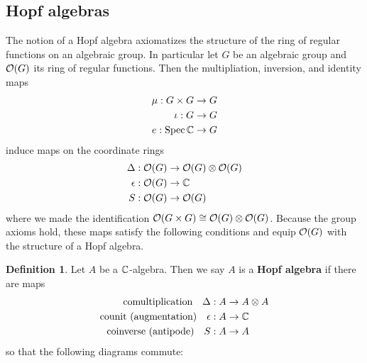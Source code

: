\documentclass{amsart}
\numberwithin{equation}{section}
\theoremstyle{plain} %
\theoremstyle{definition}
\newtheorem{definition}[equation]{Definition}
\theoremstyle{remark}
\begin{document}
\subsection{Hopf algebras}
The notion of a Hopf algebra axiomatizes
the structure of the ring of regular functions on an algebraic group.
In particular let $G$ be an algebraic group and $\mathcal{O}(G)$ its ring of regular functions.
Then the multipliation,
inversion, and identity maps \begin{align*}
	\mu: G\times G & \to G \\
	\iota: G       & \to G \\
	e: \operatorname{Spec} \mathbb{C}    & \to G
\end{align*}
induce maps on the coordinate rings
\begin{align*}
	\Delta: \mathcal{O}(G)   & \to \mathcal{O}(G)\otimes \mathcal{O}(G) \\
	\epsilon: \mathcal{O}(G) & \to \mathbb{C}                       \\
	S: \mathcal{O}(G)        & \to \mathcal{O}(G)
\end{align*} where we made the identification $\mathcal{O}(G\times G) \cong \mathcal{O}(G)\otimes \mathcal{O}(G)$.
Because the group axioms hold, these maps satisfy the following conditions and equip
$\mathcal{O}(G)$ with the structure of a Hopf algebra.
\begin{definition}\label{def:hopf}
	Let $A$ be a $\mathbb{C}$-algebra. Then we say $A$ is a \textbf{Hopf algebra} if there are maps \begin{align*}
		\text{comultiplication\quad}\Delta: A        & \to A\otimes A \\
		\text{counit (augmentation)\quad}\epsilon: A & \to \mathbb{C}         \\
		\text{coinverse (antipode)\quad}S: A         & \to A
	\end{align*}
	so that the following diagrams commute:
	\begin{center}
		 \\

		 \\


	\end{center}
\end{definition}
\end{document}
